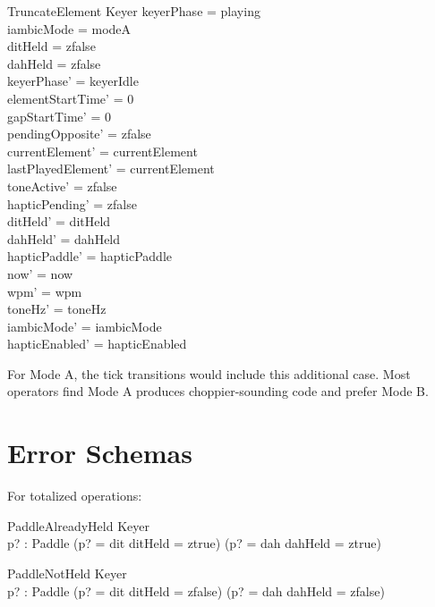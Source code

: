 \documentclass[a4paper,10pt,fleqn]{article}
\begin{document}
\begin{schema}{TruncateElement}
\Delta Keyer
\where
keyerPhase = playing \\
iambicMode = modeA \\
ditHeld = zfalse \\
dahHeld = zfalse \\
keyerPhase' = keyerIdle \\
elementStartTime' = 0 \\
gapStartTime' = 0 \\
pendingOpposite' = zfalse \\
currentElement' = currentElement \\
lastPlayedElement' = currentElement \\
toneActive' = zfalse \\
hapticPending' = zfalse \\
ditHeld' = ditHeld \\
dahHeld' = dahHeld \\
hapticPaddle' = hapticPaddle \\
now' = now \\
wpm' = wpm \\
toneHz' = toneHz \\
iambicMode' = iambicMode \\
hapticEnabled' = hapticEnabled
\end{schema}

For Mode A, the tick transitions would include this additional case. Most
operators find Mode A produces choppier-sounding code and prefer Mode B.

\section{Error Schemas}

For totalized operations:

\begin{schema}{PaddleAlreadyHeld}
\Xi Keyer \\
p? : Paddle
\where
(p? = dit \land ditHeld = ztrue) \lor
(p? = dah \land dahHeld = ztrue)
\end{schema}

\begin{schema}{PaddleNotHeld}
\Xi Keyer \\
p? : Paddle
\where
(p? = dit \land ditHeld = zfalse) \lor
(p? = dah \land dahHeld = zfalse)
\end{schema}
\end{document}
